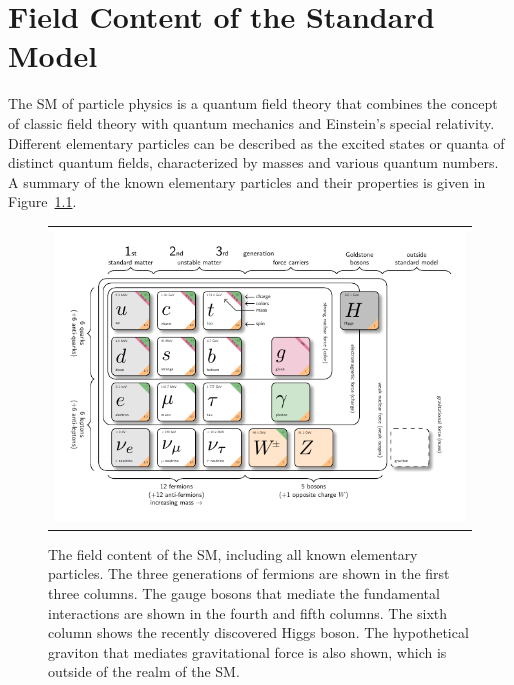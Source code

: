 \chapter{Field Content of the Standard Model}
\label{chap:Field}

The \ac{SM} of particle physics is a quantum field theory that combines the concept of classic field theory with quantum mechanics and Einstein's special relativity. Different elementary particles can be described as the excited states or quanta of distinct quantum fields, characterized by masses and various quantum numbers. A summary of the known elementary particles and their properties is given in Figure~\ref{fig:Field}.

\begin{figure}[tbh!]
 \begin{center}
 \begin{tabular}{c}
 \includegraphics[width=\textwidth]{figures/Part1/Field/SM}
 \end{tabular}
 \caption{The field content of the \ac{SM}, including all known elementary particles. The three generations of fermions are shown in the first three columns. The gauge bosons that mediate the fundamental interactions are shown in the fourth and fifth columns. The sixth column shows the recently discovered Higgs boson. The hypothetical graviton that mediates gravitational force is also shown, which is outside of the realm of the \ac{SM}.~\cite{tikz:SM}}
 \label{fig:Field}
 \end{center}
\end{figure}

